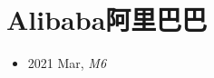 \section{Alibaba阿里巴巴}\label{com:Alibaba}

\begin{itemize}
    \item 2021 Mar, \textit{M6}\cite{M6}
\end{itemize}

